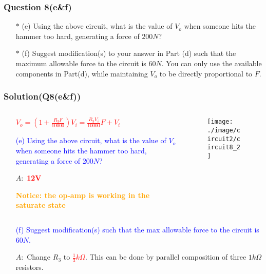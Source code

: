 \documentclass{beamer}
\newcommand{\blue}[1]{\textcolor{blue}{#1}}
\newcommand{\red}[1]{\textcolor{red}{#1}}
\newcommand{\orange}[1]{\textcolor{orange}{#1}}
\begin{document}
\begin{frame}
\frametitle{Question 8(e\&f)}
\begin{itemize} \itemsep1pt \parskip0pt 
  \item[$\ast$] (e) Using the above circuit, what is the value of $V_o$ when someone hits the hammer too hard, generating a force of $200N$?
  \item[$\ast$] (f) Suggest modification(s) to your answer in Part (d) such that the maximum allowable force to the circuit is $60N$. You can only use the available components in Part(d), while maintaining $V_o$ to be directly proportional to $F$.
\end{itemize}

\vspace{6 cm}

\end{frame}


\begin{frame}
\frametitle{Solution(Q8(e\&f))}

\begin{columns}
\begin{column}{8cm}


\begin{itemize} \itemsep1pt \parskip0pt 
  \item[] \red{$V_o = (1 + \frac{R_3F}{10000})V_i = \frac{R_3V_i}{10000}F + V_i$}
  \vspace{8 mm}
  \item[] \blue{(e) Using the above circuit, what is the value of $V_o$ when someone hits the hammer too hard, generating a force of $200N$?}
  \item[$A:$] \red{\bf 12V}
  \item[] \orange{\bf Notice: the op-amp is working in the saturate state}
\end{itemize}
\end{column}


\begin{column}{4cm}
\begin{figure}[H]
  \centering
  \texttt{[image: ./image/circuit2/circuit8\_2]}
\end{figure}
\end{column}
\end{columns}



\begin{itemize} \itemsep1pt \parskip0pt 
  \item[] \blue{(f) Suggest modification(s) such that the max allowable force to the circuit is $60N$.}
  \item[$A:$] Change $R_3$ to \red{$\frac{1}{3}k\Omega$}. This can be done by parallel composition of three $1k\Omega$ resistors.
\end{itemize}



\end{frame}
\end{document}
